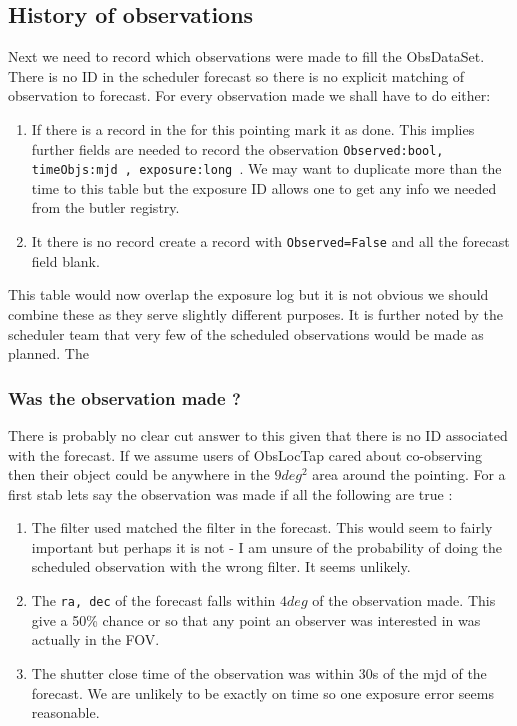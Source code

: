 \subsection{History of observations}
Next we need to record which observations were made to fill the {\textt ObsDataSet}.
There is no ID in the scheduler forecast so there is no explicit matching of observation to forecast.
For every observation made we shall have to do either:
\begin{enumerate}
\item If there is a record in the \DB for this pointing mark it as done. This implies further fields are needed to record the observation {\tt Observed:bool, timeObjs:mjd , exposure:long }. We may want to duplicate more than the time to this table but the exposure ID allows one to get any info we needed from the butler registry.
\item It there is no record create a record with {\tt Observed=False} and all the forecast field blank.
\end{enumerate}

This table would now overlap the exposure log but it is not obvious we should combine these as they serve slightly different purposes.
It is further noted by the scheduler team that very few of the scheduled observations would be made as planned. The

\subsubsection{Was the  observation made ?}\label{sec:made}
There is probably no clear cut answer to this given that there is no ID associated with the forecast.
If we assume users of ObsLocTap cared about co-observing then their object could be anywhere in the
$9 deg^2$ area around the pointing.
For a first stab lets say the observation was made if all the following are true :

\begin{enumerate}
\item The filter used matched the filter in the forecast.
This would seem to fairly important but perhaps it is not - I am unsure of the probability of
doing the scheduled observation with the wrong filter. It seems unlikely.
\item The {\tt ra, dec} of the forecast falls within $4 deg$ of the observation made.
This give a 50\% chance or so that any point an observer was interested in was actually in the FOV.
\item The shutter close time of the observation was within 30s of the mjd of the forecast.
We are unlikely to be exactly on time so one exposure error seems reasonable.
\end{enumerate}

